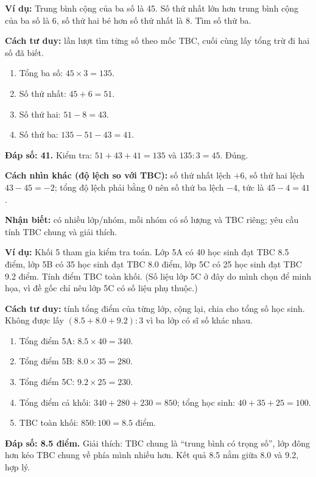 \documentclass[../main.tex]{subfiles}
\begin{document}
\smallskip\noindent\textbf{Ví dụ:} Trung bình cộng của ba số là 45. Số thứ nhất lớn hơn trung bình cộng của ba số là 6, số thứ hai bé hơn số thứ nhất là 8. Tìm số thứ ba.

\smallskip\noindent\textbf{Cách tư duy:} lần lượt tìm từng số theo mốc TBC, cuối cùng lấy tổng trừ đi hai số đã biết.
\begin{STloigiai}
\begin{enumerate}
  \item Tổng ba số: $45\times 3=135$.
  \item Số thứ nhất: $45+6=51$.
  \item Số thứ hai: $51-8=43$.
  \item Số thứ ba: $135-51-43=41$.
\end{enumerate}
\textbf{Đáp số: 41.} Kiểm tra: $51+43+41=135$ và $135:3=45$. Đúng.

\smallskip
\textbf{Cách nhìn khác (độ lệch so với TBC):} số thứ nhất lệch $+6$, số thứ hai lệch $43-45=-2$;
tổng độ lệch phải bằng 0 nên số thứ ba lệch $-4$, tức là $45-4=41$.
\end{STloigiai}

\textbf{Nhận biết:} có nhiều lớp/nhóm, mỗi nhóm có số lượng và TBC riêng; yêu cầu tính TBC chung và giải thích.

\smallskip\noindent\textbf{Ví dụ:} Khối 5 tham gia kiểm tra toán. Lớp 5A có 40 học sinh đạt TBC 8.5 điểm, lớp 5B có 35 học sinh đạt TBC 8.0 điểm, lớp 5C có 25 học sinh đạt TBC 9.2 điểm. Tính điểm TBC toàn khối. (Số liệu lớp 5C ở đây do mình chọn để minh họa, vì đề gốc chỉ nêu lớp 5C có số liệu phụ thuộc.)

\smallskip\noindent\textbf{Cách tư duy:} tính tổng điểm của từng lớp, cộng lại, chia cho tổng số học sinh.
Không được lấy $(8.5+8.0+9.2):3$ vì ba lớp có sĩ số khác nhau.
\begin{STloigiai}
\begin{enumerate}
  \item Tổng điểm 5A: $8.5\times 40=340$.
  \item Tổng điểm 5B: $8.0\times 35=280$.
  \item Tổng điểm 5C: $9.2\times 25=230$.
  \item Tổng điểm cả khối: $340+280+230=850$; tổng học sinh: $40+35+25=100$.
  \item TBC toàn khối: $850:100=8.5$ điểm.
\end{enumerate}
\textbf{Đáp số: 8.5 điểm.} Giải thích: TBC chung là ``trung bình có trọng số'', lớp đông hơn kéo TBC chung về phía mình nhiều hơn. Kết quả 8.5 nằm giữa 8.0 và 9.2, hợp lý.
\end{STloigiai}
\end{document}
